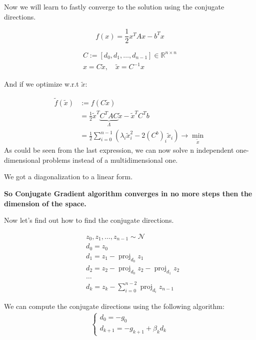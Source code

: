 Now we will learn to fastly converge to the solution using the conjugate directions.

\[ 
    f(x) = \frac{1}{2} x^T A x - b^T x 
\] 

\begin{gather*}
    C:= [d_0, d_1, \ldots, d_{n-1}] \in \mathbb{R}^{n \times n} \\ 
    x = C \tilde{x}, \quad \tilde{x} = C^{-1} x
\end{gather*}

And if we optimize w.r.t $\tilde{x}$: 

\begin{align*}
    \tilde{f}(\tilde{x}) &:= f(C \tilde{x}) \\ 
    &= \frac{1}{2} \tilde{x}^T \underbrace{C^T A C}_{\Lambda} \tilde{x} - \tilde{x}^T C^T b \\
    &= \frac{1}{2} \sum^{n-1}_{i=0} \left(\lambda_i \tilde{x}_i^2 - 2 (C^ b)_i \tilde{x}_i \right) \to \min_{\tilde{x}}
\end{align*}
As could be seen from the last expression, we can now solve n independent one-dimensional problems instead of a multidimensional one.

We got a diagonalization to a linear form.


\textbf{So Conjugate Gradient algorithm converges in no more steps then the dimension of the space.}

Now let's find out how to find the conjugate directions.

\begin{align*}
    &z_0, z_1, \ldots, z_{n-1} \sim \mathcal{N} \\ 
    &d_0 = z_0 \\ 
    &d_1 = z_1 - \operatorname{proj}_{d_0} z_1 \\
    &d_2 = z_2 - \operatorname{proj}_{d_0} z_2 - \operatorname{proj}_{d_1} z_2 \\
    &\ldots \\
    &d_k = z_k - \sum^{n-2}_{i=0} \operatorname{proj}_{d_i} z_{n - 1}
\end{align*}

We can compute the conjugate directions using the following algorithm:
\begin{gather*}
    \begin{cases}
        d_0 = -g_0 \\ 
        d_{k+1} = -g_{k+1} + \beta_k d_k
    \end{cases}
\end{gather*}

